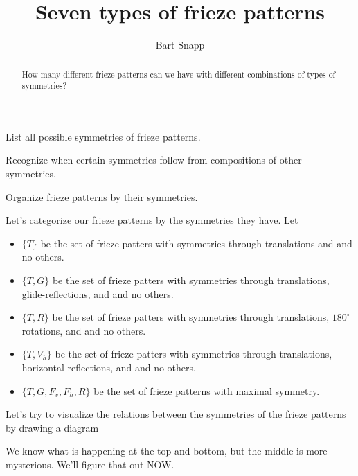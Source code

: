 \documentclass[noauthor,nooutcomes,hints,handout]{ximera}
\author{Bart Snapp}
\title{Seven types of frieze patterns}
\begin{document}
\begin{abstract}
  How many different frieze patterns can we have with different combinations of  types of symmetries?
\end{abstract}
\maketitle

\begin{listOutcomes}
\item List all possible symmetries of frieze patterns.
\item Recognize when certain symmetries follow from compositions of
  other symmetries.
\item Organize frieze patterns by their symmetries.
\end{listOutcomes}



Let's categorize our frieze patterns by the symmetries they have. Let
\begin{itemize}
  \item $\{T\}$ be the set of frieze patters with symmetries through
    translations and and no others.
  \item $\{T,G\}$ be the set of frieze patters with symmetries through
    translations, glide-reflections, and and no others.
  \item $\{T,R\}$ be the set of frieze patters with symmetries through
    translations, $180^\circ$ rotations, and and no others.
  \item $\{T,V_h\}$ be the set of frieze patters with symmetries
    through translations, horizontal-reflections, and and no
    others.
  \item $\{T,G,F_v,F_h,R\}$ be the set of frieze patterns with maximal
    symmetry.
\end{itemize}
Let's try to visualize the relations between the symmetries of the
frieze patterns by drawing a diagram
\begin{center}
\end{center}
We know what is happening at the top and bottom, but the middle is
more mysterious. We'll figure that out NOW.
\end{document}
